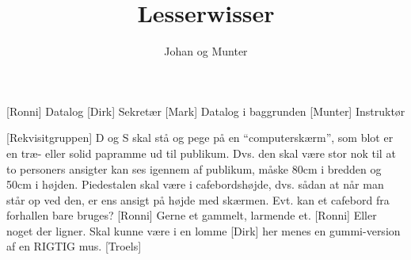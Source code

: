 \documentclass[a4paper,11pt]{article}
\title{Lesserwisser}
\author{Johan og Munter}
\begin{document}
\maketitle

\begin{roles}
	[Ronni] Datalog
	[Dirk] Sekretær
	[Mark] Datalog i baggrunden
	[Munter] Instruktør
\end{roles}

\begin{props}
[Rekvisitgruppen] D og S skal stå og pege på en ``computerskærm'', som blot er en træ- eller solid papramme ud til publikum. Dvs. den skal være stor nok til at to personers ansigter kan ses igennem af publikum, måske 80cm i bredden og 50cm i højden. Piedestalen skal være i cafebordshøjde, dvs. sådan at når man står op ved den, er ens ansigt på højde med skærmen. Evt. kan et cafebord fra forhallen bare bruges?
[Ronni] Gerne et gammelt, larmende et.
[Ronni] Eller noget der ligner. Skal kunne være i en lomme
[Dirk] her menes en gummi-version af en RIGTIG mus.
[Troels] 
\end{props}
\end{document}

